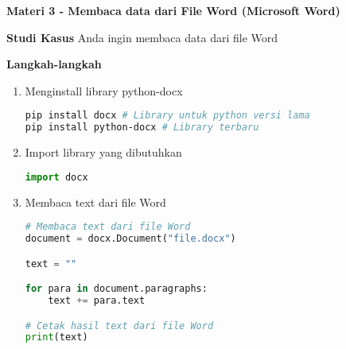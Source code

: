 \documentclass{article}
\begin{document}
    \begin{flushleft}
        \textbf{Materi 3 - Membaca data dari File Word (Microsoft Word)}
        \newline

        \textbf{Studi Kasus}
        \newline
        Anda ingin membaca data dari file Word
        \newline

        \textbf{Langkah-langkah}

        \begin{enumerate}
            \item Menginstall library python-docx
            \lstset{style=bashstyle}
            \begin{lstlisting}[language=bash]
pip install docx # Library untuk python versi lama
pip install python-docx # Library terbaru
            \end{lstlisting}

            \item Import library yang dibutuhkan
            \lstset{style=pythonstyle}
            \begin{lstlisting}[language=python]
import docx
            \end{lstlisting}

            \item Membaca text dari file Word
            \lstset{style=pythonstyle}
            \begin{lstlisting}[language=python]
# Membaca text dari file Word
document = docx.Document("file.docx")

text = ""

for para in document.paragraphs:
    text += para.text

# Cetak hasil text dari file Word
print(text)
            \end{lstlisting}
        \end{enumerate}
    \end{flushleft}
\end{document}
